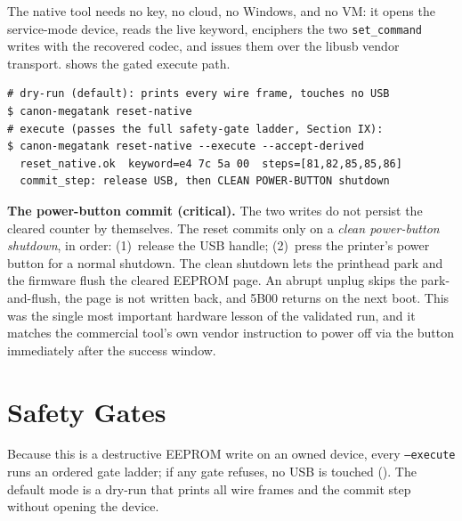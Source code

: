 \documentclass[conference]{IEEEtran}
\begin{document}
The native tool needs no key, no cloud, no Windows, and no VM: it opens
the service-mode device, reads the live keyword, enciphers the two
\texttt{set\_command} writes with the recovered codec, and issues them
over the libusb vendor transport.  shows the gated
execute path.

\begin{lstlisting}[style=shell,caption={Native reset (gated execute path).},
label={lst:native-run}]
# dry-run (default): prints every wire frame, touches no USB
$ canon-megatank reset-native
# execute (passes the full safety-gate ladder, Section IX):
$ canon-megatank reset-native --execute --accept-derived
  reset_native.ok  keyword=e4 7c 5a 00  steps=[81,82,85,85,86]
  commit_step: release USB, then CLEAN POWER-BUTTON shutdown
\end{lstlisting}

\noindent\textbf{The power-button commit (critical).} The two writes do
not persist the cleared counter by themselves. The reset commits only on a
\emph{clean power-button shutdown}, in order: (1)~release the USB handle;
(2)~press the printer's power button for a normal shutdown. The clean
shutdown lets the printhead park and the firmware flush the cleared EEPROM
page. An abrupt unplug skips the park-and-flush, the page is not written
back, and 5B00 returns on the next boot. This was the single most
important hardware lesson of the validated run, and it matches the
commercial tool's own vendor instruction to power off via the button
immediately after the success window.

\section{Safety Gates}
\label{sec:safety}

Because this is a destructive EEPROM write on an owned device, every
\texttt{--execute} runs an ordered gate ladder; if any gate refuses, no
USB is touched (). The default mode is a dry-run that
prints all wire frames and the commit step without opening the device.
\end{document}
